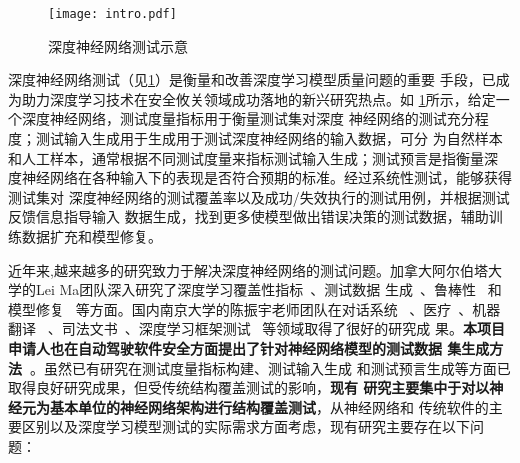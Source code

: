 \begin{figure}[htp]
    \centering
    \texttt{[image: intro.pdf]}
    \caption{深度神经网络测试示意}
    \label{fig:ch1:intro}
\end{figure}

深度神经网络测试（见\cref{fig:ch1:intro}）是衡量和改善深度学习模型质量问题的重要
手段，已成为助力深度学习技术在安全攸关领域成功落地的新兴研究热点。如
\cref{fig:ch1:intro}所示，给定一个深度神经网络，测试度量指标用于衡量测试集对深度
神经网络的测试充分程度；测试输入生成用于生成用于测试深度神经网络的输入数据，可分
为自然样本和人工样本，通常根据不同测试度量来指标测试输入生成；测试预言是指衡量深
度神经网络在各种输入下的表现是否符合预期的标准。经过系统性测试，能够获得测试集对
深度神经网络的测试覆盖率以及成功/失效执行的测试用例，并根据测试反馈信息指导输入
数据生成，找到更多使模型做出错误决策的测试数据，辅助训练数据扩充和模型修复。





近年来,越来越多的研究致力于解决深度神经网络的测试问题。加拿大阿尔伯塔大学的Lei
Ma团队深入研究了深度学习覆盖性指标~\cite{ma2018deepgauge,ma2019deepct}、测试数据
生成~\cite{xie2019coverage,xie2019deephunter}、鲁棒性
~\cite{wang2020deepsonar,sun2020stealthy,zhang2020generating}和模型修复
~\cite{yu2021deeprepair}等方面。国内南京大学的陈振宇老师团队在对话系统
~\cite{liu2021dialtest}、医疗~\cite{hou2021taumed}、机器翻译
~\cite{ji2021automated}、司法文书~\cite{guo2020taujud}、深度学习框架测试
~\cite{zhang2021duo,zhang2021predoo,luo2021graph}等领域取得了很好的研究成
果。\textbf{本项目申请人也在自动驾驶软件安全方面提出了针对神经网络模型的测试数据
集生成方法~\cite{xu2021deepsuite}}。虽然已有研究在测试度量指标构建、测试输入生成
和测试预言生成等方面已取得良好研究成果，但受传统结构覆盖测试的影响，\textbf{现有
研究主要集中于对以神经元为基本单位的神经网络架构进行结构覆盖测试}，从神经网络和
传统软件的主要区别以及深度学习模型测试的实际需求方面考虑，现有研究主要存在以下问
题：

